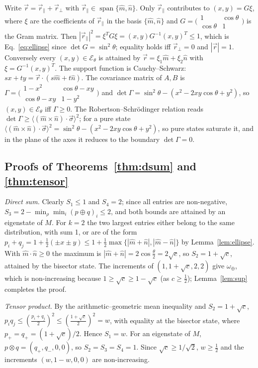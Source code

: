 \documentclass[11pt]{article}
\theoremstyle{definition}
\newcommand{\vecr}{\vec r}
\newcommand{\mhat}{\hat m}
\newcommand{\nhat}{\hat n}
\newcommand{\vsigma}{\vec\sigma}
\newcommand{\omplus}{\omega_{\oplus}}
\newcommand{\sqc}{\sqrt{c}}
\begin{document}
Write $\vecr=\vecr_\parallel+\vecr_\perp$ with $\vecr_\parallel\in\operatorname{span}\{\mhat,\nhat\}$.
Only $\vecr_\parallel$ contributes to $(x,y)=G\xi$, where $\xi$ are the coefficients of
$\vecr_\parallel$ in the basis $\{\mhat,\nhat\}$ and $G=\bigl(\begin{smallmatrix}1&\cos\theta\\
\cos\theta&1\end{smallmatrix}\bigr)$ is the Gram matrix. Then
$|\vecr_\parallel|^2=\xi^TG\xi=(x,y)G^{-1}(x,y)^T\le1$, which is Eq.~\eqref{eq:ellipse} since
$\det G=\sin^2\theta$; equality holds iff $\vecr_\perp=0$ and $|\vecr|=1$. Conversely every
$(x,y)\in\mathcal E_\theta$ is attained by $\vecr=\xi_1\mhat+\xi_2\nhat$ with
$\xi=G^{-1}(x,y)^T$. The support function is Cauchy--Schwarz:
$sx+ty=\vecr\cdot(s\mhat+t\nhat)$. The covariance matrix of $A,B$ is
$\Gamma=\bigl(\begin{smallmatrix}1-x^2&\cos\theta-xy\\\cos\theta-xy&1-y^2\end{smallmatrix}\bigr)$
and $\det\Gamma=\sin^2\theta-(x^2-2xy\cos\theta+y^2)$, so $(x,y)\in\mathcal E_\theta$ iff
$\Gamma\ge0$. The Robertson--Schr\"odinger relation reads
$\det\Gamma\ge\langle(\mhat\times\nhat)\cdot\vsigma\rangle^2$; for a pure state
$\langle(\mhat\times\nhat)\cdot\vsigma\rangle^2=\sin^2\theta-(x^2-2xy\cos\theta+y^2)$, so pure
states saturate it, and in the plane of the axes it reduces to the boundary
$\det\Gamma=0$.

\subsection*{Proofs of Theorems~\ref{thm:dsum} and \ref{thm:tensor}}

\emph{Direct sum.} Clearly $S_1\le1$ and $S_4=2$; since all entries are
non-negative, $S_3=2-\min_\rho\min_i(p\oplus q)_i\le2$, and both bounds are attained by
an eigenstate of $M$. For $k=2$ the two largest entries either belong to the
same distribution, with sum 1, or are of the form
$p_i+q_j=1+\frac12(\pm x\pm y)\le1+\frac12\max\{|\mhat+\nhat|,|\mhat-\nhat|\}$ by
Lemma~\ref{lem:ellipse}. With $\mhat\cdot\nhat\ge0$ the maximum is
$|\mhat+\nhat|=2\cos\frac\theta2=2\sqc$, so $S_2=1+\sqc$, attained by the bisector state.
The increments of $(1,1+\sqc,2,2)$ give $\omplus$, which is non-increasing because
$1\ge\sqc\ge1-\sqc$ (as $c\ge\frac12$); Lemma~\ref{lem:sup} completes the proof.

\emph{Tensor product.} By the arithmetic--geometric mean inequality and
$S_2=1+\sqc$, $p_iq_j\le(\frac{p_i+q_j}2)^2\le(\frac{1+\sqc}2)^2=w$, with equality at the
bisector state, where $p_+=q_+=(1+\sqc)/2$. Hence $S_1=w$. For an eigenstate of $M$,
$p\otimes q=(q_+,q_-,0,0)$, so $S_2=S_3=S_4=1$. Since $\sqc\ge1/\sqrt2$, $w\ge\frac12$
and the increments $(w,1-w,0,0)$ are non-increasing.
\end{document}
